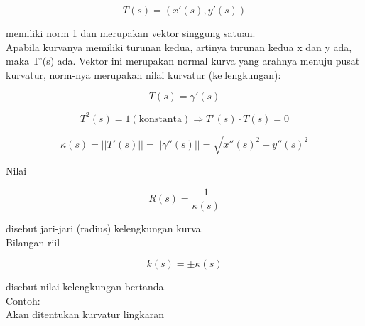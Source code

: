 \documentclass{article}
\begin{document}
\begin{eulernotebook}
\begin{eulercomment}
\begin{eulercomment}
\begin{eulercomment}
\begin{eulercomment}
\begin{eulercomment}
\begin{eulercomment}
\begin{eulercomment}
\begin{eulercomment}
\begin{eulercomment}
\begin{eulercomment}
\begin{eulercomment}
\begin{eulercomment}
\begin{eulercomment}
\begin{eulercomment}
\begin{eulercomment}
\begin{eulercomment}
\begin{eulercomment}
\begin{eulercomment}
\begin{eulercomment}
\begin{eulercomment}
\begin{eulercomment}
\begin{eulercomment}
\begin{eulercomment}
\end{eulercomment}
\begin{eulerformula}
\[
T(s)=(x'(s),y'(s))
\]
\end{eulerformula}
\begin{eulercomment}
memiliki norm 1 dan merupakan vektor singgung satuan.\\
Apabila kurvanya memiliki turunan kedua, artinya turunan kedua x dan y
ada, maka T’(s) ada. Vektor ini merupakan normal kurva yang arahnya
menuju pusat kurvatur, norm-nya merupakan nilai kurvatur
(kelengkungan):

\end{eulercomment}
\begin{eulerformula}
\[
T(s)=\gamma'(s)
\]
\end{eulerformula}
\begin{eulerformula}
\[
T^2(s)=1(\text{konstanta})\Rightarrow T'(s)\cdot T(s)=0
\]
\end{eulerformula}
\begin{eulerformula}
\[
\kappa(s)=||T'(s)||=||\gamma''(s)||=\sqrt{x''(s)^2+y''(s)^2}
\]
\end{eulerformula}
\begin{eulercomment}
Nilai

\end{eulercomment}
\begin{eulerformula}
\[
R(s)=\frac{1}{\kappa(s)}
\]
\end{eulerformula}
\begin{eulercomment}
disebut jari-jari (radius) kelengkungan kurva.\\
Bilangan riil

\end{eulercomment}
\begin{eulerformula}
\[
k(s)=\pm \kappa(s)
\]
\end{eulerformula}
\begin{eulercomment}
disebut nilai kelengkungan bertanda.\\
Contoh:\\
Akan ditentukan kurvatur lingkaran


\end{eulercomment}
\end{eulercomment}
\end{eulercomment}
\end{eulercomment}
\end{eulercomment}
\end{eulercomment}
\end{eulercomment}
\end{eulercomment}
\end{eulercomment}
\end{eulercomment}
\end{eulercomment}
\end{eulercomment}
\end{eulercomment}
\end{eulercomment}
\end{eulercomment}
\end{eulercomment}
\end{eulercomment}
\end{eulercomment}
\end{eulercomment}
\end{eulercomment}
\end{eulercomment}
\end{eulercomment}
\end{eulercomment}
\end{eulernotebook}
\end{document}
